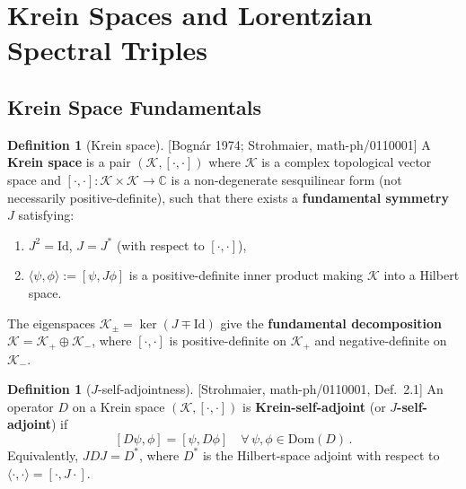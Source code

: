 \documentclass[12pt,a4paper]{article}
\theoremstyle{definition}
\newtheorem{definition}[proposition]{Definition}
\theoremstyle{remark}
\newcommand{\Id}{\mathrm{Id}}
\newcommand{\fromlit}[1]{\textcolor{blue!70!black}{\textsf{[#1]}}}
\begin{document}
\section{Krein Spaces and Lorentzian Spectral Triples}
\label{sec:krein}

\subsection{Krein Space Fundamentals}

\begin{definition}[Krein space]
\label{def:krein-space}
\fromlit{Bogn\'{a}r 1974; Strohmaier, math-ph/0110001}
A \textbf{Krein space} is a pair $(\mathcal{K}, [\cdot,\cdot])$ where
$\mathcal{K}$ is a complex topological vector space and
$[\cdot,\cdot] : \mathcal{K} \times \mathcal{K} \to \mathbb{C}$ is a
non-degenerate sesquilinear form (not necessarily positive-definite),
such that there exists a \textbf{fundamental symmetry} $J$ satisfying:
\begin{enumerate}[nosep,label=(\roman*)]
  \item $J^2 = \Id$, \quad $J = J^*$ (with respect to $[\cdot,\cdot]$),
  \item $\langle\psi,\phi\rangle := [\psi, J\phi]$ is a positive-definite
    inner product making $\mathcal{K}$ into a Hilbert space.
\end{enumerate}
The eigenspaces $\mathcal{K}_\pm = \ker(J \mp \Id)$ give the
\textbf{fundamental decomposition}
$\mathcal{K} = \mathcal{K}_+ \oplus \mathcal{K}_-$, where
$[\cdot,\cdot]$ is positive-definite on $\mathcal{K}_+$ and
negative-definite on $\mathcal{K}_-$.
\end{definition}

\begin{definition}[$J$-self-adjointness]
\label{def:J-selfadjoint}
\fromlit{Strohmaier, math-ph/0110001, Def.~2.1}
An operator $D$ on a Krein space $(\mathcal{K}, [\cdot,\cdot])$ is
\textbf{Krein-self-adjoint} (or \textbf{$J$-self-adjoint}) if
\begin{equation}\label{eq:krein-sa}
  [D\psi, \phi] = [\psi, D\phi]
  \quad \forall\, \psi,\phi \in \mathrm{Dom}(D)\,.
\end{equation}
Equivalently, $JDJ = D^*$, where $D^*$ is the Hilbert-space adjoint
with respect to $\langle\cdot,\cdot\rangle = [\cdot,J\cdot]$.
\end{definition}
\end{document}
